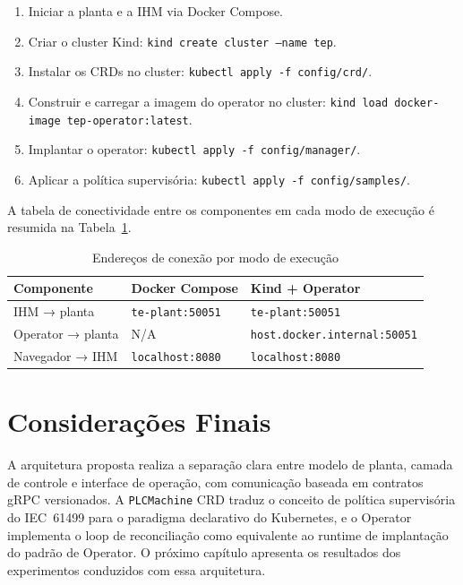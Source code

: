 \begin{enumerate}
  \item Iniciar a planta e a IHM via Docker Compose.
  \item Criar o cluster Kind: \texttt{kind create cluster --name tep}.
  \item Instalar os CRDs no cluster: \texttt{kubectl apply -f config/crd/}.
  \item Construir e carregar a imagem do operator no cluster: \texttt{kind load docker-image tep-operator:latest}.
  \item Implantar o operator: \texttt{kubectl apply -f config/manager/}.
  \item Aplicar a política supervisória: \texttt{kubectl apply -f config/samples/}.
\end{enumerate}

A tabela de conectividade entre os componentes em cada modo de execução é resumida na Tabela~\ref{tab:conectividade}.

\begin{table}[ht!]
\centering
\caption{Endereços de conexão por modo de execução}
\label{tab:conectividade}
\begin{tabular}{|l|l|l|}
\hline
\textbf{Componente}       & \textbf{Docker Compose}      & \textbf{Kind + Operator} \\
\hline
IHM → planta              & \texttt{te-plant:50051}      & \texttt{te-plant:50051}  \\
Operator → planta         & N/A                          & \texttt{host.docker.internal:50051} \\
Navegador → IHM           & \texttt{localhost:8080}      & \texttt{localhost:8080}  \\
\hline
\end{tabular}
\end{table}

\section{Considerações Finais}
\label{sec:dev_conclusao}

A arquitetura proposta realiza a separação clara entre modelo de planta, camada de controle e interface de operação, com comunicação baseada em contratos gRPC versionados. A \texttt{PLCMachine} CRD traduz o conceito de política supervisória do IEC~61499 para o paradigma declarativo do Kubernetes, e o Operator implementa o loop de reconciliação como equivalente ao runtime de implantação do padrão de Operator. O próximo capítulo apresenta os resultados dos experimentos conduzidos com essa arquitetura.

